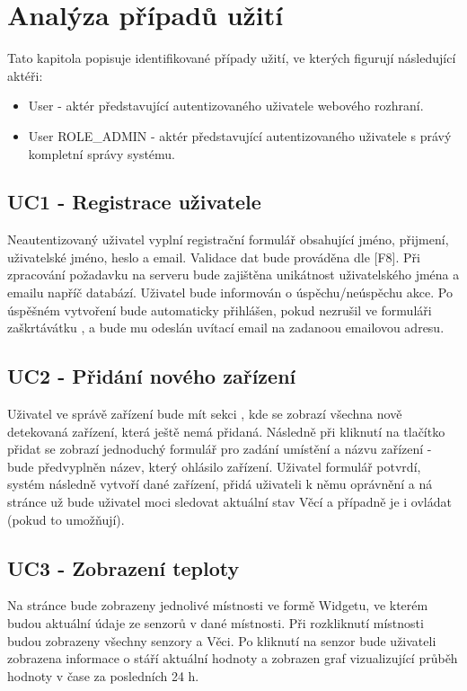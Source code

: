 \documentclass[thesis=B,czech]{FITthesis}[2019/12/23]
\begin{document}
\section{Analýza případů užití}
Tato kapitola popisuje identifikované případy užití, ve kterých figurují následující aktéři:
\begin{itemize}
    \item User - aktér představující autentizovaného uživatele webového rozhraní.
    \item User ROLE\_ADMIN - aktér představující autentizovaného uživatele s právý kompletní správy systému.
\end{itemize}

\subsection{UC1 - Registrace uživatele}
Neautentizovaný uživatel vyplní registrační formulář obsahující jméno, přijmení, uživatelské jméno, heslo a email. Validace dat bude prováděna dle [F8]. Při zpracování požadavku na serveru bude zajištěna unikátnost uživatelského jména a emailu napříč databází. Uživatel bude informován o úspěchu/neúspěchu akce. Po úspěšném vytvoření bude automaticky přihlášen, pokud nezrušil ve formuláři zaškrtávátku , a bude mu odeslán uvítací email na zadanoou emailovou adresu.

\subsection{UC2 - Přidání nového zařízení}
\label{UC:UC2}
Uživatel ve správě zařízení bude mít sekci , kde se zobrazí všechna nově detekovaná zařízení, která ještě nemá přidaná. Následně při kliknutí na tlačítko přidat se zobrazí jednoduchý formulář pro zadání umístění a názvu zařízení - bude předvyplněn název, který ohlásilo zařízení. Uživatel formulář potvrdí, systém následně vytvoří dané zařízení, přidá uživateli k němu oprávnění a ná stránce  už bude uživatel moci sledovat aktuální stav Věcí a případně je i ovládat (pokud to umožňují).

\subsection{UC3 - Zobrazení teploty}
Na stránce  bude zobrazeny jednolivé místnosti ve formě Widgetu, ve kterém budou aktuální údaje ze senzorů v dané místnosti. Při rozkliknutí místnosti budou zobrazeny všechny senzory a Věci. Po kliknutí na senzor bude uživateli zobrazena informace o stáří aktuální hodnoty a zobrazen graf vizualizující průběh hodnoty v čase za posledních 24 h.
\end{document}
